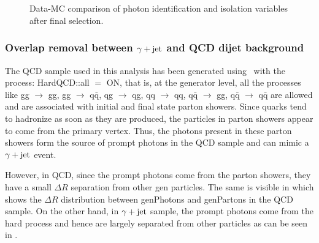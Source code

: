 \begin{figure}[htbp]
\centering
  \hspace{0.2in}
 \\
 \hspace{0.2in}
  \\
  \hspace{0.2in}
\caption{Data-MC comparison of photon identification and isolation variables after final selection.}
\label{fig:PhIdnIso}
\end{figure}

\subsubsection{Overlap removal between $\gamma+\mathrm{jet}$ and QCD dijet background}
The QCD sample used in this analysis has been generated using \pythia\ with the process: HardQCD::all $=$ ON, that is, at the generator level, all the processes like
gg $\rightarrow$ gg, gg $\rightarrow$ q$\bar{\textrm{q}}$, qg $\rightarrow$ qg, qq $\rightarrow$ qq, q$\bar{\textrm{q}}$ $\rightarrow$ gg,
q$\bar{\textrm{q}}$ $\rightarrow$ q$\bar{\textrm{q}}$ are allowed and are associated with initial and final state parton showers. Since quarks tend to hadronize
as soon as they are produced, the particles in parton showers appear to come from the primary vertex. Thus, the photons present in these parton showers
form the source of prompt photons in the QCD sample and can mimic a $\gamma+\mathrm{jet}$ event.

However, in QCD, since the prompt photons come from the parton showers, they have a small $\Delta R$ separation from other gen particles. The same
is visible in \fig{\ref{fig:QCD_dr}} which shows the $\Delta R$ distribution between genPhotons and genPartons in the QCD sample. On the other hand, in $\gamma+\mathrm{jet}$ sample,
the prompt photons come from the hard process and hence are largely separated from other particles as can be seen in \fig{\ref{fig:GJet_dr}}.

